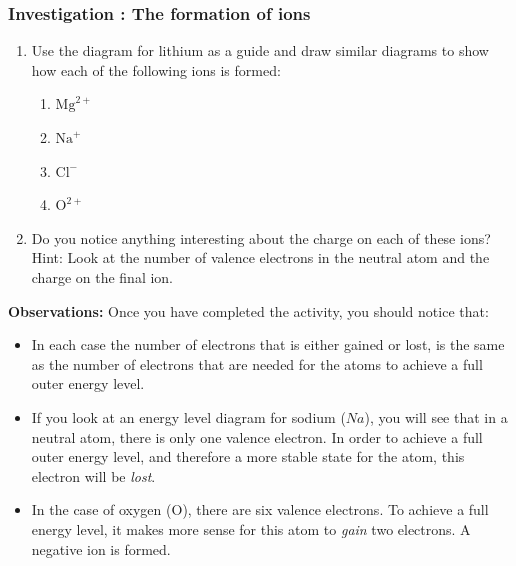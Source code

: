            \subsubsection{  Investigation : The formation of ions
        }
            \nopagebreak
        \label{m38757*id260856}\begin{enumerate}[noitemsep, label=\textbf{\arabic*}. ] 
            \label{m38757*uid123}\item Use the diagram for lithium as a guide and draw similar diagrams to show how each of the following ions is formed:
\label{m38757*id260872}\begin{enumerate}[noitemsep, label=\textbf{\alph*}. ] 
            \label{m38757*uid124}\item ${\mathrm{Mg}}^{2+}$ \label{m38757*uid125}\item ${\mathrm{Na}}^{+}$ \label{m38757*uid126}\item ${\mathrm{Cl}}^{-}$ \label{m38757*uid127}\item ${\mathrm{O}}^{2+}$ \end{enumerate}
        \label{m38757*uid128}\item Do you notice anything interesting about the charge on each of these ions? Hint: Look at the number of valence electrons in the neutral atom and the charge on the final ion.
\end{enumerate}
        \label{m38757*id261008}\noindent{}\textbf{Observations: }\newline
    Once you have completed the activity, you should notice that:
        \label{m38757*id261012}\begin{itemize}[noitemsep]
            \label{m38757*uid129}\item In each case the number of electrons that is either gained or lost, is the same as the number of electrons that are needed for the atoms to achieve a full outer energy level.
\label{m38757*uid130}\item If you look at an energy level diagram for sodium ($Na$), you will see that in a neutral atom, there is only one valence electron. In order to achieve a full outer energy level, and therefore a more stable state for the atom, this electron will be \textsl{lost}.
\label{m38757*uid131}\item In the case of oxygen ($\mathrm{O}$), there are six valence electrons. To achieve a full energy level, it makes more sense for this atom to \textsl{gain} two electrons. A negative ion is formed.
\end{itemize}
        \par \label{m38757*eip-531}
